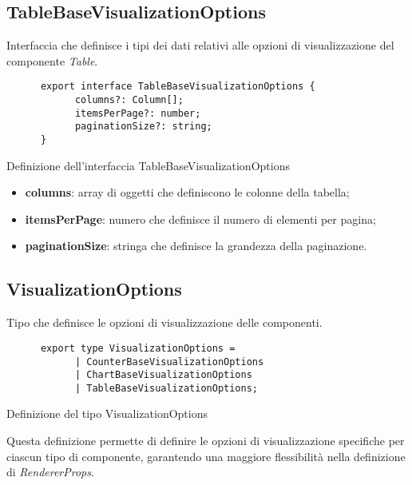 \subsection{TableBaseVisualizationOptions}
Interfaccia che definisce i tipi dei dati relativi alle opzioni di visualizzazione del componente \textit{Table}.
\begin{listing}[H]
      \begin{verbatim}
      export interface TableBaseVisualizationOptions {
            columns?: Column[];
            itemsPerPage?: number;
            paginationSize?: string;
      }
      \end{verbatim}
      \caption{Definizione dell'interfaccia TableBaseVisualizationOptions}
      \label{listing:tableBaseVisualizationOptions}
\end{listing}
\begin{itemize}
      \item \textbf{columns}: array di oggetti che definiscono le colonne della tabella;
      \item \textbf{itemsPerPage}: numero che definisce il numero di elementi per pagina;
      \item \textbf{paginationSize}: stringa che definisce la grandezza della paginazione.
\end{itemize}

\subsection{VisualizationOptions}
Tipo che definisce le opzioni di visualizzazione delle componenti.
\begin{listing}[H]
      \begin{verbatim}
      export type VisualizationOptions = 
            | CounterBaseVisualizationOptions 
            | ChartBaseVisualizationOptions 
            | TableBaseVisualizationOptions;
      \end{verbatim}
      \caption{Definizione del tipo VisualizationOptions}
      \label{listing:visualizationOptions}
\end{listing}
Questa definizione permette di definire le opzioni di visualizzazione specifiche per ciascun tipo di componente, garantendo una maggiore flessibilità
nella definizione di \textit{RendererProps}.

